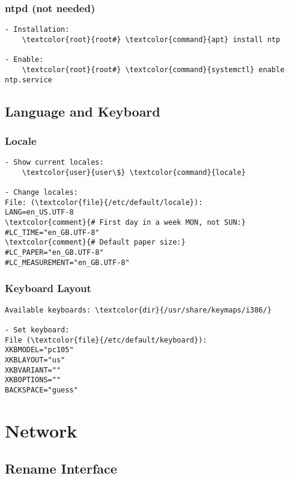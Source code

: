 \documentclass[10pt, a4paper, onecolumn, openany]{book} %
\begin{document}
\subsection{ntpd (not needed)}
\begin{Verbatim}[commandchars=\\\{\}]
- Installation:
    \textcolor{root}{root#} \textcolor{command}{apt} install ntp

- Enable:
    \textcolor{root}{root#} \textcolor{command}{systemctl} enable ntp.service
\end{Verbatim}




\section{Language and Keyboard}
\subsection{Locale}
\begin{Verbatim}[commandchars=\\\{\}]
- Show current locales:
    \textcolor{user}{user\$} \textcolor{command}{locale}

- Change locales:
File: (\textcolor{file}{/etc/default/locale}):
LANG=en_US.UTF-8
\textcolor{comment}{# First day in a week MON, not SUN:}
#LC_TIME="en_GB.UTF-8"
\textcolor{comment}{# Default paper size:}
#LC_PAPER="en_GB.UTF-8"
#LC_MEASUREMENT="en_GB.UTF-8"
\end{Verbatim}

\subsection{Keyboard Layout}
\begin{Verbatim}[commandchars=\\\{\}]
Available keyboards: \textcolor{dir}{/usr/share/keymaps/i386/}

- Set keyboard:
File (\textcolor{file}{/etc/default/keyboard}):
XKBMODEL="pc105"
XKBLAYOUT="us"
XKBVARIANT=""
XKBOPTIONS=""
BACKSPACE="guess"
\end{Verbatim}


\chapter{Network}
\section{Rename Interface}
\end{document}
